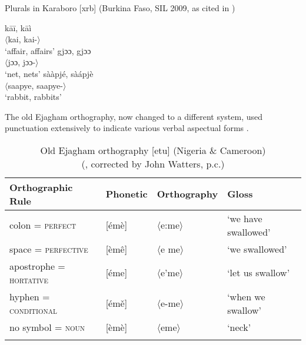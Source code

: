 \documentclass[output=paper]{langscibook}
\begin{document}
\ea Plurals in Karaboro [xrb] (Burkina Faso, SIL 2009, as cited in \citealt{Roberts2013})\label{tab:KaraboroPlurals}\setlength{\multicolsep}{0pt}
\begin{multicols}{3}
\ea\gll\relax\ob kāī, kāì\cb \\           $\langle$kai, kai-$\rangle$ \\\glt ‘affair, affairs’
\ex\gll\relax\ob gjɔɔ, gjɔɔ\cb \\         $\langle$jɔɔ, jɔɔ-$\rangle$ \\\glt ‘net, nets’
\ex\gll\relax\ob sààpjé, sàápjè\cb \\     $\langle$saapye, saapye-$\rangle$ \\\glt ‘rabbit, rabbits’
\z\end{multicols}\z
    
The old Ejagham orthography, now changed to a different system, used punctuation extensively to indicate various verbal aspectual forms .

    \begin{table}
        \begin{tabularx}{\textwidth}{llXl}
            \lsptoprule
            Orthographic Rule & Phonetic & Orthography & Gloss\\\midrule
            colon =  \textsc{perfect} & [émè]       & $\langle$e:me$\rangle$ & ‘we have swallowed’\\
            space =  \textsc{perfective} & [èmê]    & $\langle$e me$\rangle$ & ‘we swallowed’\\
            apostrophe = \textsc{hortative} & [éme] & $\langle$e’me$\rangle$ & ‘let us swallow’\\
            hyphen =   \textsc{conditional} & [émě] & $\langle$e-me$\rangle$ & ‘when we swallow’\\
            no symbol =  \textsc{noun} & [èmè]      & $\langle$eme$\rangle$ & ‘neck’\\
            \lspbottomrule
        \end{tabularx}
        \caption{Old Ejagham orthography [etu] (Nigeria \& Cameroon)\\
             (\citealt{Bird1999b}, corrected by John Watters, p.c.)\label{tab:cahill:fiaghamOrtho:13}}
    \end{table}
    
\end{document}
